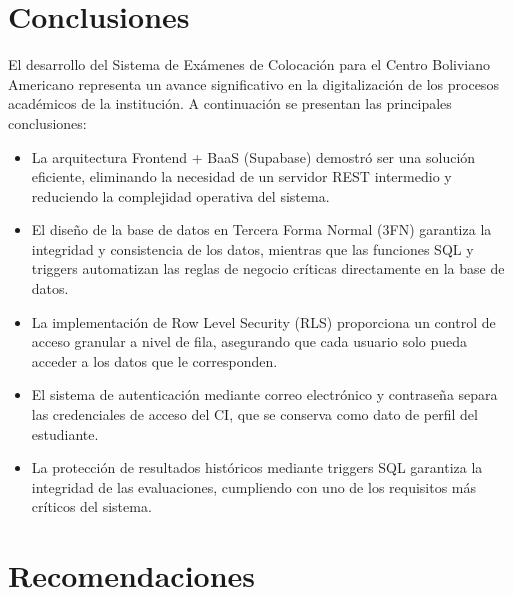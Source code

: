 \section{Conclusiones}

El desarrollo del Sistema de Exámenes de Colocación para el Centro Boliviano Americano representa un avance significativo en la digitalización de los procesos académicos de la institución. A continuación se presentan las principales conclusiones:

\begin{itemize}
    \item La arquitectura Frontend + BaaS (Supabase) demostró ser una solución eficiente, eliminando la necesidad de un servidor REST intermedio y reduciendo la complejidad operativa del sistema.
    \item El diseño de la base de datos en Tercera Forma Normal (3FN) garantiza la integridad y consistencia de los datos, mientras que las funciones SQL y triggers automatizan las reglas de negocio críticas directamente en la base de datos.
    \item La implementación de Row Level Security (RLS) proporciona un control de acceso granular a nivel de fila, asegurando que cada usuario solo pueda acceder a los datos que le corresponden.
    \item El sistema de autenticación mediante correo electrónico y contraseña separa las credenciales de acceso del CI, que se conserva como dato de perfil del estudiante.
    \item La protección de resultados históricos mediante triggers SQL garantiza la integridad de las evaluaciones, cumpliendo con uno de los requisitos más críticos del sistema.
\end{itemize}

\section{Recomendaciones}

